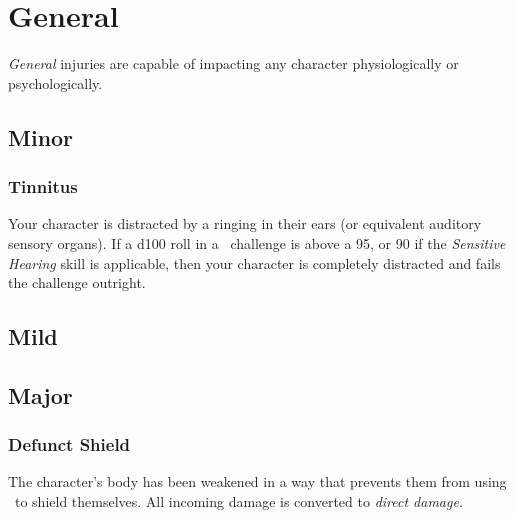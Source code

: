 \section{General}\label{sec:gen_injuries}
\emph{General} injuries are capable of impacting any character physiologically or psychologically.
\subsection{Minor}
\begin{multicols}{2}
\subsubsection*{Tinnitus}
Your character is distracted by a ringing in their ears (or equivalent auditory sensory organs). If a d100 roll in a \KNOWful\ challenge is above a 95, or 90 if the \emph{Sensitive Hearing} skill is applicable, then your character is completely distracted and fails the challenge outright.

\end{multicols}
\subsection{Mild}
\begin{multicols}{2}

\end{multicols}
\subsection{Major}
\begin{multicols}{2}
\subsubsection*{Defunct Shield}
The character's body has been weakened in a way that prevents them from using \ENful\ to shield themselves. All incoming damage is converted to \emph{direct damage}.

\end{multicols}

